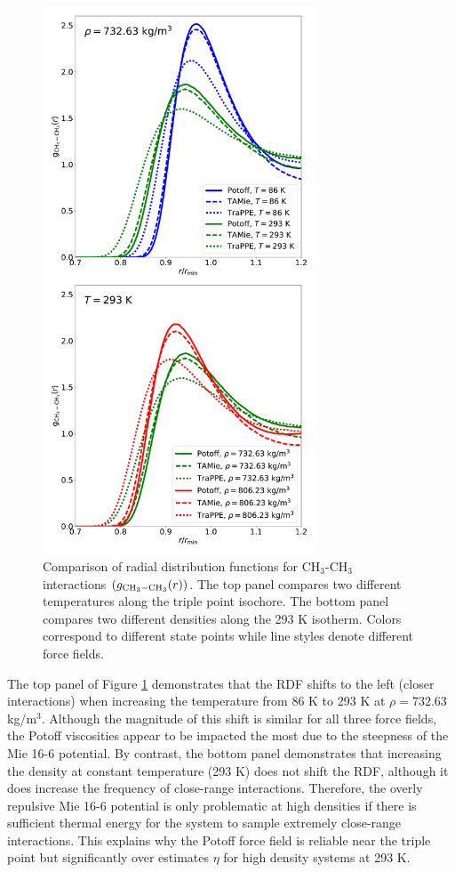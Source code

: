 \documentclass[preprint,review,12pt]{elsarticle}
\begin{document}
	\begin{figure}[htb!]
		\centering
		\includegraphics[width=3.2in]{RDF_comparison_CH3.pdf}
		\caption{Comparison of radial distribution functions for CH$_3$-CH$_3$ interactions $(g_{\rm CH_3-CH_3}(r))$. The top panel compares two different temperatures along the triple point isochore. The bottom panel compares two different densities along the 293 K isotherm. Colors correspond to different state points while line styles denote different force fields.}
		\label{fig:RDF_comparison_CH3}
	\end{figure} 
	
	The top panel of Figure \ref{fig:RDF_comparison_CH3} demonstrates that the RDF shifts to the left (closer interactions) when increasing the temperature from 86 K to 293 K at $\rho = 732.63$ kg/m$^3$. Although the magnitude of this shift is similar for all three force fields, the Potoff viscosities appear to be impacted the most due to the steepness of the Mie 16-6 potential. By contrast, the bottom panel demonstrates that increasing the density at constant temperature (293 K) does not shift the RDF, although it does increase the frequency of close-range interactions. Therefore, the overly repulsive Mie 16-6 potential is only problematic at high densities if there is sufficient thermal energy for the system to sample extremely close-range interactions. This explains why the Potoff force field is reliable near the triple point but significantly over estimates $\eta$ for high density systems at 293 K.
	
\end{document}
